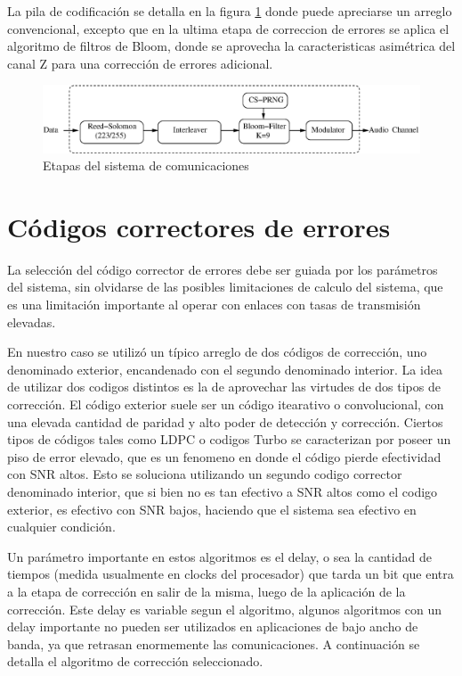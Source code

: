 La pila de codificación se detalla en la figura \ref{fig_comstack} donde puede apreciarse un arreglo convencional, excepto que en la ultima etapa de correccion de errores se aplica el algoritmo de filtros de Bloom, donde se aprovecha la caracteristicas asimétrica del canal Z para una corrección de errores adicional.

\begin{figure}[t]
\centering
\includegraphics[width=0.9 \textwidth]{Soft-stack2.eps} 
\caption{Etapas del sistema de comunicaciones}
\label{fig_comstack}
\end{figure}

\section{Códigos correctores de errores}

La selección del código corrector de errores debe ser guiada por los parámetros del sistema, sin olvidarse de las posibles limitaciones de calculo del sistema, que es una limitación importante al operar con enlaces con tasas de transmisión elevadas.

En nuestro caso se utilizó un típico arreglo de dos códigos de corrección, uno denominado exterior, encandenado con el segundo denominado interior.
La idea de utilizar dos codigos distintos es la de aprovechar las virtudes de dos tipos de corrección. El código exterior suele ser un código itearativo o convolucional, con una elevada cantidad de paridad y alto poder de detección y corrección. Ciertos tipos de códigos tales como LDPC o codigos Turbo se caracterizan por poseer un piso de error elevado, que es un fenomeno en donde el código pierde efectividad con SNR altos. Esto se soluciona utilizando un segundo codigo corrector denominado interior, que si bien no es tan efectivo a SNR altos como el codigo exterior, es efectivo con SNR bajos, haciendo que el sistema sea efectivo en cualquier condición.

Un parámetro importante en estos algoritmos es el delay, o sea la cantidad de tiempos (medida usualmente en clocks del procesador) que tarda un bit que entra a la etapa de corrección en salir de la misma, luego de la aplicación de la corrección. Este delay es variable segun el algoritmo, algunos algoritmos con un delay importante no pueden ser utilizados en aplicaciones de bajo ancho de banda, ya que retrasan enormemente las comunicaciones. A continuación se detalla el algoritmo de corrección seleccionado.

